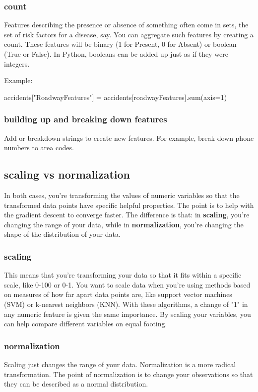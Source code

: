 \documentclass[12pt]{report}
\begin{document}
\subsubsection{count}
Features describing the presence or absence of something often come in sets, the set of risk factors for a disease, say. You can aggregate such features by creating a count. These features will be binary (1 for Present, 0 for Absent) or boolean (True or False). In Python, booleans can be added up just as if they were integers.

Example:

accidents["RoadwayFeatures"] = accidents[roadwayFeatures].sum(axis=1)

\subsubsection{building up and breaking down features}
Add or breakdown strings to create new features. For example, break down phone numbers to area codes.

\subsection{scaling vs normalization}

In both cases, you're transforming the values of numeric variables so that the transformed data points have specific helpful properties. The point is to help with the gradient descent to converge faster. The difference is that: in \textbf{scaling}, you're changing the range of your data, while in \textbf{normalization}, you're changing the shape of the distribution of your data.


\subsubsection{scaling}
This means that you're transforming your data so that it fits within a specific scale, like 0-100 or 0-1. You want to scale data when you're using methods based on measures of how far apart data points are, like support vector machines (SVM) or k-nearest neighbors (KNN). With these algorithms, a change of "1" in any numeric feature is given the same importance. By scaling your variables, you can help compare different variables on equal footing.

\subsubsection{normalization}
Scaling just changes the range of your data. Normalization is a more radical transformation. The point of normalization is to change your observations so that they can be described as a normal distribution.
\end{document}
